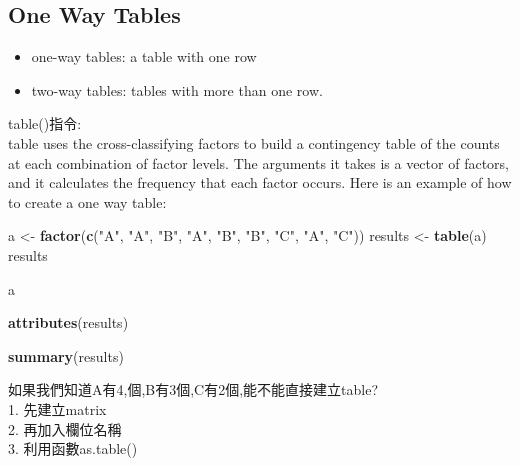 \documentclass[]{book}
\newenvironment{Shaded}{\begin{snugshade}}{\end{snugshade}}
\newcommand{\KeywordTok}[1]{\textcolor[rgb]{0.13,0.29,0.53}{\textbf{#1}}}
\newcommand{\StringTok}[1]{\textcolor[rgb]{0.31,0.60,0.02}{#1}}
\newcommand{\NormalTok}[1]{#1}
\providecommand{\tightlist}{%
  \setlength{\itemsep}{0pt}\setlength{\parskip}{0pt}}
\theoremstyle{definition}
\theoremstyle{definition}
\theoremstyle{definition}
\theoremstyle{remark}
\begin{document}
\subsection{One Way Tables}\label{one-way-tables}

\begin{itemize}
\tightlist
\item
  one-way tables: a table with one row
\item
  two-way tables: tables with more than one row.
\end{itemize}

table()指令:\\
table uses the cross-classifying factors to build a contingency table of
the counts at each combination of factor levels. The arguments it takes
is a vector of factors, and it calculates the frequency that each factor
occurs. Here is an example of how to create a one way table:

\begin{Shaded}
\begin{Highlighting}[]
\NormalTok{a <-}\StringTok{ }\KeywordTok{factor}\NormalTok{(}\KeywordTok{c}\NormalTok{(}\StringTok{"A"}\NormalTok{, }\StringTok{"A"}\NormalTok{, }\StringTok{"B"}\NormalTok{, }\StringTok{"A"}\NormalTok{, }\StringTok{"B"}\NormalTok{, }\StringTok{"B"}\NormalTok{, }\StringTok{"C"}\NormalTok{, }\StringTok{"A"}\NormalTok{, }\StringTok{"C"}\NormalTok{))}
\NormalTok{results <-}\StringTok{ }\KeywordTok{table}\NormalTok{(a)}
\NormalTok{results}
\end{Highlighting}
\end{Shaded}

\begin{Shaded}
\begin{Highlighting}[]
\NormalTok{a}
\end{Highlighting}
\end{Shaded}

\begin{Shaded}
\begin{Highlighting}[]
\KeywordTok{attributes}\NormalTok{(results)}
\end{Highlighting}
\end{Shaded}

\begin{Shaded}
\begin{Highlighting}[]
\KeywordTok{summary}\NormalTok{(results)}
\end{Highlighting}
\end{Shaded}

如果我們知道A有4,個,B有3個,C有2個,能不能直接建立table?\\
1. 先建立matrix\\
2. 再加入欄位名稱\\
3. 利用函數as.table()
\end{document}
